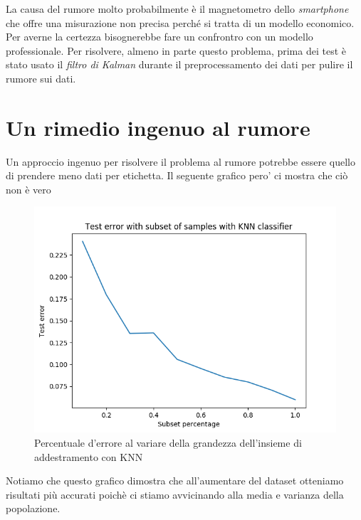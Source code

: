 La causa del rumore molto probabilmente \`e il magnetometro dello  \textit{smartphone} che offre una misurazione non precisa perch\'e si tratta di un modello economico. Per averne la certezza bisognerebbe fare un confrontro con un modello professionale. Per risolvere, almeno in parte questo problema, prima dei test \`e stato usato il \textit{filtro di Kalman} durante il preprocessamento dei dati per pulire il rumore sui dati.


\section{Un rimedio ingenuo al rumore}
Un approccio ingenuo per risolvere il problema al rumore potrebbe essere quello di prendere meno dati per etichetta. Il seguente grafico pero' ci mostra che ci\`o non \`e vero

\begin{figure}[H]
	\centering
	\includegraphics[width=0.7\linewidth]{img/rumor_graph_knn}
	\caption{Percentuale d'errore al variare della grandezza dell'insieme di addestramento con KNN}
	\label{fig:rumorgraphknn}
\end{figure}

Notiamo che questo grafico dimostra che all'aumentare del dataset otteniamo risultati pi\`u  accurati poich\`e ci stiamo avvicinando alla media e varianza della popolazione.



